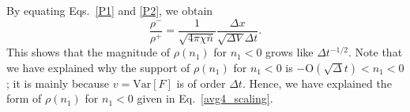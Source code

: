 \documentclass{article}
\begin{document}
By equating Eqs.~\eqref{P1} and \eqref{P2}, we obtain
\begin{equation}
\frac{\rho^-}{\rho^+}=\frac{1}{\sqrt{4\pi\chi\bar{n}}}\frac{\Delta x}{\sqrt{\Delta V}\Delta t}.
\end{equation}
This shows that the magnitude of $\rho(n_1)$ for $n_1<0$ grows like $\Delta t^{-1/2}$.
Note that we have explained why the support of $\rho(n_1)$ for $n_1<0$ is $-\mathrm{O}(\sqrt{\Delta}t)<n_1<0$; it is mainly because $v=\mathrm{Var}[F]$ is of order $\Delta t$.
Hence, we have explained the form of $\rho(n_1)$ for $n_1<0$ given in Eq.~\eqref{avg4_scaling}.
\end{document}
